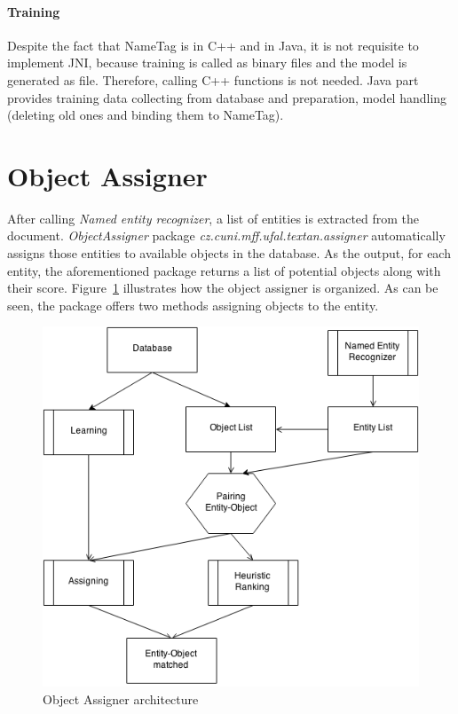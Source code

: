 \paragraph{Training}
Despite the fact that NameTag is in C++ and \textan{} in Java, it is not
requisite to implement JNI, because training is called as binary files and the
model is generated as file. Therefore, calling C++ functions is not needed. Java
part provides training data collecting from database and preparation, model
handling (deleting old ones and binding them to NameTag).

\section{Object Assigner}
\label{sec:ObjectAssigner}

After calling \emph{Named entity recognizer}, a list of entities is extracted from the document. \emph{ObjectAssigner} package
\emph{cz.cuni.mff.ufal.textan.assigner} automatically assigns those entities to
available objects in the database. As the output, for each entity, the
aforementioned package returns a list of potential objects along
with their score. Figure~\ref{fig:objectassigner} illustrates 
how the object assigner is organized. As can be seen, the package offers 
two methods assigning objects to the entity.

\begin{figure}[!htb]
        \centering
        \includegraphics[width=\textwidth]{Images/assigner.png}
        \caption{Object Assigner architecture}
        \label{fig:objectassigner}
\end{figure}


